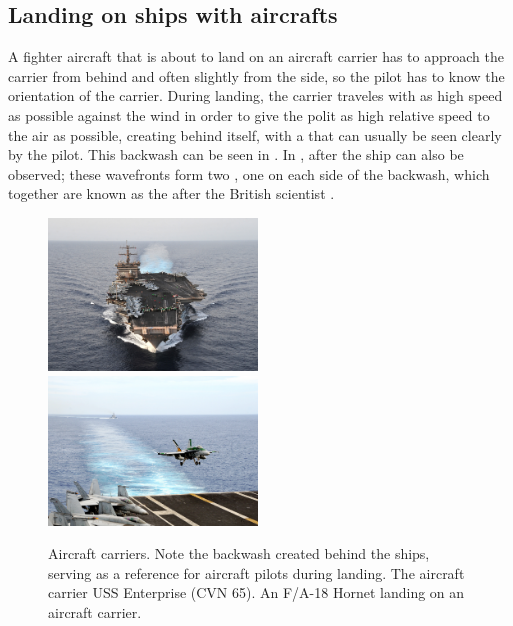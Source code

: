 \subsection{Landing on ships with aircrafts}

A fighter aircraft that is about to land on an aircraft carrier has to approach the carrier from behind and often slightly from the side, so the pilot has to know the orientation of the carrier. During landing, the carrier traveles with as high speed as possible against the wind in order to give the polit as high relative speed to the air as possible, creating \wake behind itself, with a \backwash that can usually be seen clearly by the pilot. This backwash can be seen in . In ,  after the ship can also be observed; these wavefronts form two , one on each side of the backwash, which together are known as the  after the British scientist .

\begin{figure}
    \centering
    \subcaptionbox{\label{fig:aircraft_carrier_full_wake}} {\includegraphics[width=0.495\textwidth]{Images/Public_domain/The_aircraft_carrier_USS_Enterprise_(CVN_65)}}
    \subcaptionbox{\label{fig:aircraft_carrier_landing_backwash}} {\includegraphics[width=0.495\textwidth]{Images/Public_domain/An_F-A-18C_Hornet_lands_on_the_aircraft_carrier_USS_George_Washington_(CVN_73)}}
    \caption{Aircraft carriers. Note the backwash created behind the ships, serving as a reference for aircraft pilots during landing.  The aircraft carrier USS Enterprise (CVN 65).  An F/A-18 Hornet landing on an aircraft carrier.}
    \label{fig:aircraft_carriers_and_backwash}
\end{figure}


